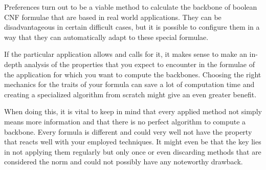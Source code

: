 Preferences turn out to be a viable method to calculate the backbone of boolean CNF formulae that are based in real world applications. They can be disadvantageous in certain difficult cases, but it is possible to configure them in a way that they can automatically adapt to these special formulae.

If the particular application allows and calls for it, it makes sense to make an in-depth analysis of the properties that you expect to encounter in the formulae of the application for which you want to compute the backbones. Choosing the right mechanics for the traits of your formula can save a lot of computation time and creating a specialized algorithm from scratch might give an even greater benefit.

When doing this, it is vital to keep in mind that every applied method not simply means more information and that there is no perfect algorithm to compute a backbone. Every formula is different and could very well not have the property that reacts well with your employed techniques. It might even be that the key lies in not applying them regularly but only once or even discarding methods that are considered the norm and could not possibly have any noteworthy drawback.


\iffalse
TODO prefbones ist besser für echtwelt beispiele, ohne prefs zuverlässiger bei komplizierten beispielen

kombination aus strategien auf fallbeispiel optimieren(?)

Guiding the behaviour of the SAT solver using preferences can be very beneficial in the case of real world applications and where it would be disadvantageous, the penalty can be kept under control. 

nicht alles was algorithmisch erlaubt ist, bringt automatisch performance vorteile

die aggressivste methode muss nicht zwangsläufig irgend einen benefit bringen

future work dazu machen


\fi